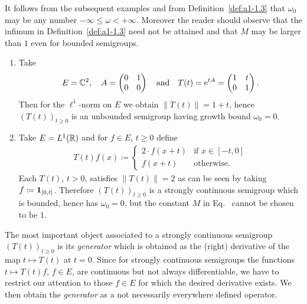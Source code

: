 It follows from the subsequent examples and from Definition~\ref{def:a1-1.3} that $\omega_{0}$ may be any number $ -\infty \leq \omega < +\infty$.
Moreover the reader should observe that the infimum in Definition~\ref{def:a1-1.3} need not be attained and that $M$ may be larger than $1$ even for bounded semigroups.
\begin{examples}\label{ex:a1-1.4}
\begin{enumerate}[\upshape(i), wide, labelindent=.25em]

\item 
Take 
\[
	E = \mathbb{C}^{2}, \quad
	A = \begin{pmatrix}0 & 1\\0 & 0\end{pmatrix} 
	\quad \text{and} \quad 
	T(t) =  \mathrm{e}^{tA} = \begin{pmatrix}1 & t\\0 & 1\end{pmatrix} .
\]
%
Then for the $\ell^{1}$-norm on $E$ we obtain $\|T(t)\| = 1 + t$, hence $(T(t))_{t\geq0}$ is an unbounded semigroup having growth bound $\omega_{0} = 0$.

\item 
Take $E = L^1(\mathbb{R})$ and for $f \in E$, $t \geq 0$ define
\begin{align*}
T(t)f(x) \coloneq 
	\begin{cases}
		2\cdot f(x+t) & \text{if } x \in [-t,0] \\
		f(x+t) & \text{otherwise}.
	\end{cases}
\end{align*}
Each $T(t)$, $t > 0$, satisfies $\|T(t)\| = 2$ as can be seen by taking $f \coloneq  \mathbf{1}_{[0,t]}$.
Therefore $(T(t))_{t \geq 0}$ is a strongly continuous semigroup which is bounded, hence has $\omega_{0} = 0$, but the constant $M$ in Eq.~ cannot be chosen to be $1$.

\end{enumerate}
\end{examples} 
The most important object associated to a strongly continuous semigroup $(T(t))_{t\geq0}$ is its \emph{generator} which is obtained as the (right) derivative of the map $t \mapsto T(t)$ at $t = 0$.
Since for strongly continuous semigroups the functions $t \mapsto T(t)f$, $f \in E$, are continuous but not always differentiable, we have to restrict our attention to those $f \in E$ for which the desired derivative exists.
We then obtain the \emph{generator} as a not necessarily everywhere defined operator.
